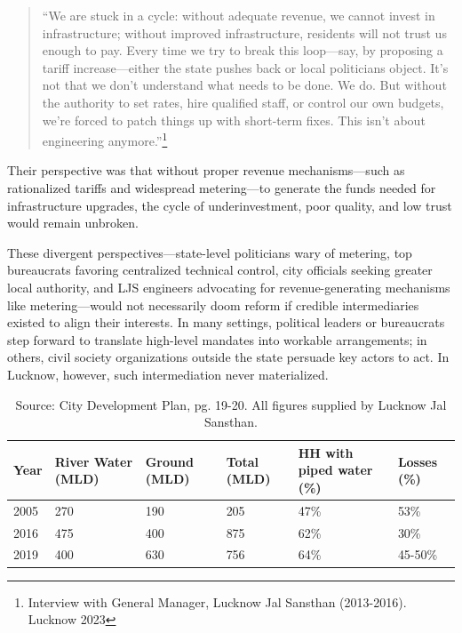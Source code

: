 \begin{quote}

 “We are stuck in a cycle: without adequate revenue, we cannot invest in infrastructure; without improved infrastructure, residents will not trust us enough to pay. Every time we try to break this loop—say, by proposing a tariff increase—either the state pushes back or local politicians object. It’s not that we don’t understand what needs to be done. We do. But without the authority to set rates, hire qualified staff, or control our own budgets, we’re forced to patch things up with short-term fixes. This isn’t about engineering anymore.”\footnote{Interview with General Manager, Lucknow Jal Sansthan (2013-2016). Lucknow 2023}\end{quote}

Their perspective was that without proper revenue mechanisms—such as rationalized tariffs and widespread metering—to generate the funds needed for infrastructure upgrades, the cycle of underinvestment, poor quality, and low trust would remain unbroken.

These divergent perspectives—state-level politicians wary of metering, top bureaucrats favoring centralized technical control, city officials seeking greater local authority, and LJS engineers advocating for revenue-generating mechanisms like metering—would not necessarily doom reform if credible intermediaries existed to align their interests. In many settings, political leaders or bureaucrats step forward to translate high-level mandates into workable arrangements; in others, civil society organizations outside the state persuade key actors to act. In Lucknow, however, such intermediation never materialized.

\begin{table}[h!]
\centering
\caption{Water Supply and Losses (2005-2019)}
\begin{tabular}{|p{1.5cm}|p{2.5cm}|p{2.5cm}|p{2cm}|p{3cm}|p{2.5cm}|}
\hline
\textbf{Year} & \textbf{River Water (MLD)} & \textbf{Ground (MLD)} & \textbf{Total (MLD)} & \textbf{HH with piped water (\%)} & \textbf{Losses (\%)} \\ \hline
2005 & 270 & 190 & 205 & 47\% & 53\% \\ \hline
2016 & 475 & 400 & 875 & 62\% & 30\% \\ \hline
2019 & 400 & 630 & 756 & 64\% & 45-50\% \\ \hline
\end{tabular}
\caption*{Source: City Development Plan, pg. 19-20. All figures supplied by Lucknow Jal Sansthan.}
\end{table}


